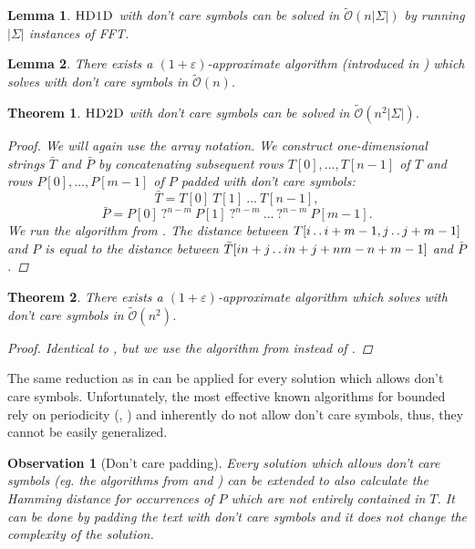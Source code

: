 \documentclass[11pt]{article}
\def\dd{\mathinner{.\,.}}
\newcommand{\tO}{\tilde{\mathcal{O}}}
\theoremstyle{plain}
\newtheorem{theorem}{Theorem}
\newtheorem{lemma}{Lemma}
\newtheorem{observation}{Observation}
\theoremstyle{definition}
\theoremstyle{remark}
\begin{document}
\begin{lemma}\label{sigman1d}
	$\textsc{HD1D}$ with don't care symbols can be solved in $\tO(n|\Sigma|)$ by running $|\Sigma|$ instances of FFT.
\end{lemma}


\begin{lemma}\label{approx1d}
	There exists a $(1 + \varepsilon)$-approximate algorithm (introduced in \cite{Karloff1993}) which solves \hd with don't care symbols in $\tO(n)$.
\end{lemma}


\begin{theorem}\label{sigman2d}
	$\textsc{HD2D}$ with don't care symbols can be solved in $\tO(n^2|\Sigma|)$.
	\begin{proof}
		We will again use the array notation.
		We construct one-dimensional strings $\bar{T}$ and $\bar{P}$ by concatenating subsequent rows $T[0], \dots, T[n - 1]$ of $T$ and rows $P[0], \dots, P[m - 1]$ of $P$ padded with don't care symbols:
		$$ \bar{T} = T[0] \ T[1] \ \dots \ T[n - 1], $$
		$$ \bar{P} = P[0] \ \texttt{?}^{n - m} \ P[1] \ \texttt{?}^{n - m} \ \dots \ \texttt{?}^{n - m} \ P[m - 1].$$
		We run the algorithm from .
		The distance between $T[i \dd i + m - 1, j \dd j + m - 1]$ and $P$ is equal to the distance between $\bar{T}[in + j \dd in + j + nm - n + m - 1]$ and $\bar{P}$.
	\end{proof}
\end{theorem}


\begin{theorem}\label{approx2d}
	There exists a $(1 + \varepsilon)$-approximate algorithm which solves \HD with don't care symbols in $\tO(n^2)$.
	\begin{proof}
		Identical to , but we use the algorithm from  instead of .
	\end{proof}
\end{theorem}


The same reduction as in  can be applied for every \hd solution which allows don't care symbols.
Unfortunately, the most effective known algorithms for bounded \hd rely on periodicity (\cite{Clifford2015}, \cite{Gawrychowski2017}) and inherently do not allow don't care symbols, thus, they cannot be easily generalized.


\begin{observation}[Don't care padding]\label{dontcare_padding}
	Every \HD solution which allows don't care symbols (eg. the algorithms from  and ) can be extended to also calculate the Hamming distance for occurrences of $P$ which are not entirely contained in $T$.
	It can be done by padding the text with don't care symbols and it does not change the complexity of the solution.
\end{observation}
\end{document}
